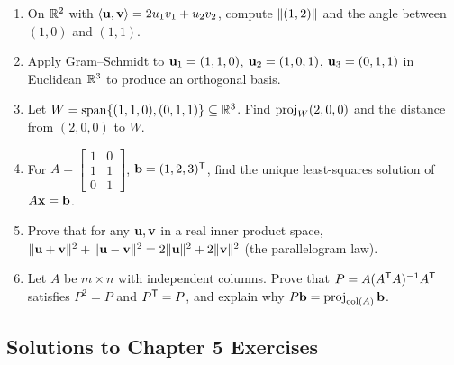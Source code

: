 \begin{enumerate}[label=\textbf{5.\arabic*},leftmargin=2.6em,itemsep=6pt]
\item On $\mathbb{R}^2$ with $\langle \mathbf{u}, \mathbf{v} \rangle=2u_1v_1+u_2v_2$, compute $\lVert (1,2) \rVert$ and the angle between $(1,0)$ and $(1,1)$.

\item Apply Gram--Schmidt to $\mathbf{u}_1=(1,1,0)$, $\mathbf{u}_2=(1,0,1)$, $\mathbf{u}_3=(0,1,1)$ in Euclidean $\mathbb{R}^3$ to produce an orthogonal basis.

\item Let $W=\operatorname{span}\{(1,1,0),(0,1,1)\}\subseteq\mathbb{R}^3$. Find $\operatorname{proj}_W(2,0,0)$ and the distance from $(2,0,0)$ to $W$.

\item For $A=\left[\begin{smallmatrix}1&0\\1&1\\0&1\end{smallmatrix}\right]$, $\mathbf{b}=(1,2,3)^{\mathsf{T}}$, find the unique least-squares solution of $A\mathbf{x}=\mathbf{b}$.

\item Prove that for any $\mathbf{u},\mathbf{v}$ in a real inner product space, $\lVert \mathbf{u}+\mathbf{v} \rVert^2+\lVert \mathbf{u}-\mathbf{v} \rVert^2=2\lVert \mathbf{u} \rVert^2+2\lVert \mathbf{v} \rVert^2$ (the parallelogram law).

\item Let $A$ be $m\times n$ with independent columns. Prove that $P=A(A^{\mathsf{T}} A)^{-1} A^{\mathsf{T}}$ satisfies $P^2=P$ and $P^{\mathsf{T}}=P$, and explain why $P\mathbf{b}=\operatorname{proj}_{\operatorname{col}(A)}\mathbf{b}$.
\end{enumerate}

\subsection*{Solutions to Chapter 5 Exercises}


